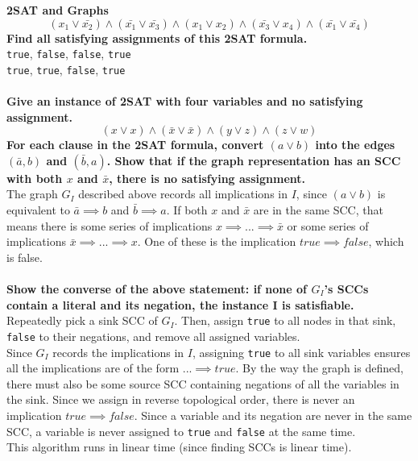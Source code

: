 \newpage
\begin{problem}{3.28}
    \textbf{2SAT and Graphs}
    \[
        (x_1 \lor \bar{x_2}) \wedge (\bar{x_1} \lor \bar{x_3}) \wedge (x_1 \lor x_2) \wedge (\bar{x_3} \lor x_4) \wedge (\bar{x_1} \lor \bar{x_4})
    \]
    \textbf{Find all satisfying assignments of this 2SAT formula.}
    \\
    \texttt{true}, \texttt{false}, \texttt{false}, \texttt{true}
    \\
    \texttt{true}, \texttt{true}, \texttt{false}, \texttt{true}
    \\
    \\
    \textbf{Give an instance of 2SAT with four variables and no satisfying assignment.}
    \[
        (x \lor x) \wedge (\bar{x} \lor \bar{x}) \wedge (y \lor z) \wedge (z \lor w)
    \]
    \textbf{For each clause in the 2SAT formula, convert $(a \lor b)$ into the edges $(\bar{a}, b)$ and $(\bar{b}, a)$. Show that if the graph representation has an SCC with both $x$ and $\bar{x}$, there is no satisfying assignment.}
    \\
    The graph $G_I$ described above records all implications in $I$, since $(a \lor b)$ is equivalent to $\bar{a} \implies b$ and $\bar{b} \implies a$. If both $x$ and $\bar{x}$ are in the same SCC, that means there is some series of implications $x \implies ... \implies \bar{x}$ or some series of implications $\bar{x} \implies ... \implies x$. One of these is the implication $true \implies false$, which is false.
    \\
    \\
    \textbf{Show the converse of the above statement: if none of $G_I$'s SCCs contain a literal and its negation, the instance I is satisfiable.}
    \\
    Repeatedly pick a sink SCC of $G_I$. Then, assign \texttt{true} to all nodes in that sink, \texttt{false} to their negations, and remove all assigned variables. 
    \\
    Since $G_I$ records the implications in $I$, assigning \texttt{true} to all sink variables ensures all the implications are of the form $... \implies true$. By the way the graph is defined, there must also be some source SCC containing negations of all the variables in the sink. Since we assign in reverse topological order, there is never an implication $true \implies false$. Since a variable and its negation are never in the same SCC, a variable is never assigned to \texttt{true} and \texttt{false} at the same time.
    \\
    This algorithm runs in linear time (since finding SCCs is linear time). 

\end{problem}

